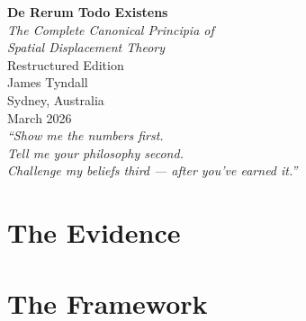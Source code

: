 \documentclass[12pt,a4paper,openright]{book}
\begin{document}
\frontmatter

\begin{titlepage}
\centering
\vspace*{3cm}
{\Huge\bfseries De Rerum Todo Existens\\[0.5cm]}
{\Large\itshape The Complete Canonical Principia of\\
Spatial Displacement Theory\\[1cm]}
{\large Restructured Edition\\[2cm]}
{\Large James Tyndall\\[0.5cm]}
{\large Sydney, Australia\\[1cm]}
{\large March 2026\\[3cm]}
{\normalsize
\textit{``Show me the numbers first.\\
Tell me your philosophy second.\\
Challenge my beliefs third --- after you've earned it.''}}
\end{titlepage}

\tableofcontents
\newpage


\mainmatter


\part{The Evidence}
\label{vol:evidence}













\part{The Framework}
\label{vol:framework}




\end{document}
